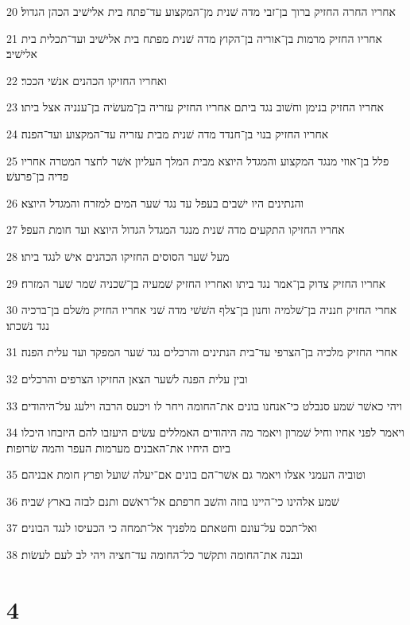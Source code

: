 \par 20 אחריו החרה החזיק ברוך בן־זבי מדה שׁנית מן־המקצוע עד־פתח בית אלישׁיב הכהן הגדול׃
\par 21 אחריו החזיק מרמות בן־אוריה בן־הקוץ מדה שׁנית מפתח בית אלישׁיב ועד־תכלית בית אלישׁיב׃
\par 22 ואחריו החזיקו הכהנים אנשׁי הככר׃
\par 23 אחריו החזיק בנימן וחשׁוב נגד ביתם אחריו החזיק עזריה בן־מעשׂיה בן־ענניה אצל ביתו׃
\par 24 אחריו החזיק בנוי בן־חנדד מדה שׁנית מבית עזריה עד־המקצוע ועד־הפנה׃
\par 25 פלל בן־אוזי מנגד המקצוע והמגדל היוצא מבית המלך העליון אשׁר לחצר המטרה אחריו פדיה בן־פרעשׁ׃
\par 26 והנתינים היו ישׁבים בעפל עד נגד שׁער המים למזרח והמגדל היוצא׃
\par 27 אחריו החזיקו התקעים מדה שׁנית מנגד המגדל הגדול היוצא ועד חומת העפל׃
\par 28 מעל שׁער הסוסים החזיקו הכהנים אישׁ לנגד ביתו׃
\par 29 אחריו החזיק צדוק בן־אמר נגד ביתו ואחריו החזיק שׁמעיה בן־שׁכניה שׁמר שׁער המזרח׃
\par 30 אחרי החזיק חנניה בן־שׁלמיה וחנון בן־צלף השׁשׁי מדה שׁני אחריו החזיק משׁלם בן־ברכיה נגד נשׁכתו׃
\par 31 אחרי החזיק מלכיה בן־הצרפי עד־בית הנתינים והרכלים נגד שׁער המפקד ועד עלית הפנה׃
\par 32 ובין עלית הפנה לשׁער הצאן החזיקו הצרפים והרכלים׃
\par 33 ויהי כאשׁר שׁמע סנבלט כי־אנחנו בונים את־החומה ויחר לו ויכעס הרבה וילעג על־היהודים׃
\par 34 ויאמר לפני אחיו וחיל שׁמרון ויאמר מה היהודים האמללים עשׂים היעזבו להם היזבחו היכלו ביום היחיו את־האבנים מערמות העפר והמה שׂרופות׃
\par 35 וטוביה העמני אצלו ויאמר גם אשׁר־הם בונים אם־יעלה שׁועל ופרץ חומת אבניהם׃
\par 36 שׁמע אלהינו כי־היינו בוזה והשׁב חרפתם אל־ראשׁם ותנם לבזה בארץ שׁביה׃
\par 37 ואל־תכס על־עונם וחטאתם מלפניך אל־תמחה כי הכעיסו לנגד הבונים׃
\par 38 ונבנה את־החומה ותקשׁר כל־החומה עד־חציה ויהי לב לעם לעשׂות׃

\chapter{4}

